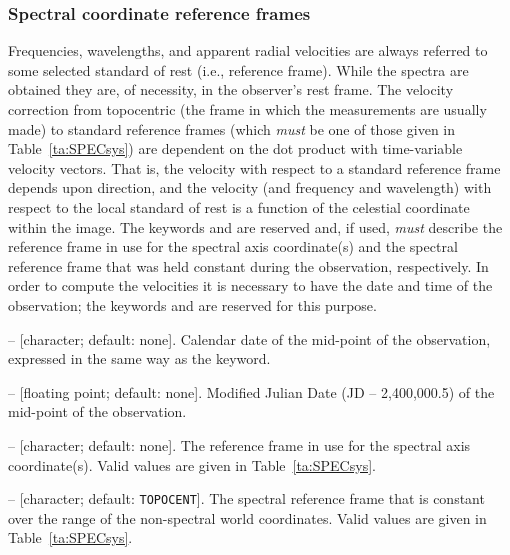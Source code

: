 \documentclass[onecolumn]{aa}
\begin{document}
\subsubsection{Spectral coordinate reference frames}

Frequencies, wavelengths, and apparent radial velocities are always referred to
some selected standard of rest (i.e., reference frame). While the spectra are
obtained they are, of necessity, in the observer's rest frame. The velocity
correction from topocentric (the frame in which the measurements are usually made)
to standard reference frames (which {\em must} be one of those given in
Table~\ref{ta:SPECsys}) are dependent on the dot product with time-variable velocity vectors.
That is, the velocity with respect to a standard reference frame depends upon
direction, and the velocity (and frequency and wavelength) with respect to the
local standard of rest is a function of the celestial coordinate within the image.
The keywords  and  are reserved and, if used,
{\em must} describe the reference frame in use for the spectral axis
coordinate(s) and the spectral reference frame that was held constant during the
observation, respectively. In order to compute the velocities it is necessary to
have the date and time of the observation; the keywords   and
 are reserved for this purpose. 

\begin{description}

\item {}  -- [character; default: none]. 
Calendar date of the
mid-point of the observation, expressed in the same way as 
the  keyword.  

\item {}  -- [floating point; default: none]. 
Modified Julian Date
(JD -- 2,400,000.5) of the mid-point of the observation.  

\item {}  -- [character; default: none]. 
The reference frame in
use for the spectral axis coordinate(s). Valid values are given in Table~\ref{ta:SPECsys}. 

\item {}  -- [character; default: \texttt{TOPOCENT}]. 
The spectral
reference frame that is constant over the range of the non-spectral world
coordinates. Valid values are given in Table~\ref{ta:SPECsys}. 

\end{description}
\end{document}
